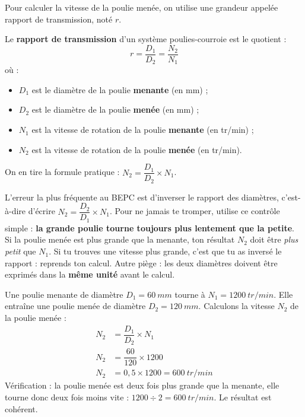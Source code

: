 \documentclass[11pt]{article}
\newcommand{\cle}[1]{{\popxbold\color{popdark}#1}}
\newcounter{popsec}
\newcounter{popsub}
\newcommand{\courssub}[1]{%
  \stepcounter{popsub}%
  \par\vspace{9pt}\noindent{\popxbold\fontsize{11.5}{13}\selectfont\color{popink}{\color{poporange}\thepopsec.\thepopsub}\hspace{6pt}#1}\par\nopagebreak\vspace{4pt}
}
\begin{document}
\courssub{Le rapport de transmission}

Pour calculer la vitesse de la poulie menée, on utilise une grandeur appelée \cle{rapport de transmission}, noté $r$.

\begin{definition}
Le \textbf{rapport de transmission} d'un système poulies-courroie est le quotient :
\[ r = \dfrac{D_1}{D_2} = \dfrac{N_2}{N_1} \]
où :
\begin{itemize}
\item $D_1$ est le diamètre de la poulie \textbf{menante} (en mm) ;
\item $D_2$ est le diamètre de la poulie \textbf{menée} (en mm) ;
\item $N_1$ est la vitesse de rotation de la poulie \textbf{menante} (en tr/min) ;
\item $N_2$ est la vitesse de rotation de la poulie \textbf{menée} (en tr/min).
\end{itemize}
On en tire la formule pratique : $N_2 = \dfrac{D_1}{D_2} \times N_1$.
\end{definition}

\begin{attention}
L'erreur la plus fréquente au BEPC est d'inverser le rapport des diamètres, c'est-à-dire d'écrire $N_2 = \dfrac{D_2}{D_1} \times N_1$. Pour ne jamais te tromper, utilise ce contrôle simple : \textbf{la grande poulie tourne toujours plus lentement que la petite}. Si la poulie menée est plus grande que la menante, ton résultat $N_2$ doit être \emph{plus petit} que $N_1$. Si tu trouves une vitesse plus grande, c'est que tu as inversé le rapport : reprends ton calcul. Autre piège : les deux diamètres doivent être exprimés dans la \textbf{même unité} avant le calcul.
\end{attention}

\begin{exemplebox}
Une poulie menante de diamètre $D_1 = \SI{60}{mm}$ tourne à $N_1 = \SI{1200}{tr/min}$. Elle entraîne une poulie menée de diamètre $D_2 = \SI{120}{mm}$. Calculons la vitesse $N_2$ de la poulie menée :
\begin{align*}
N_2 &= \dfrac{D_1}{D_2} \times N_1 \\
N_2 &= \dfrac{60}{120} \times 1200 \\
N_2 &= 0,5 \times 1200 = \SI{600}{tr/min}
\end{align*}
Vérification : la poulie menée est deux fois plus grande que la menante, elle tourne donc deux fois moins vite : $1200 \div 2 = \SI{600}{tr/min}$. Le résultat est cohérent.
\end{exemplebox}
\end{document}
